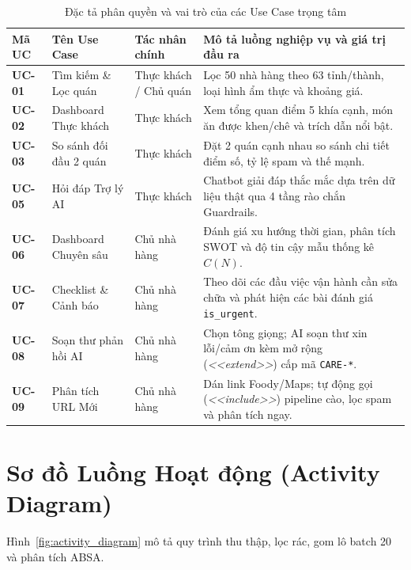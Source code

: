 \begin{table}[H]
\centering
\caption{Đặc tả phân quyền và vai trò của các Use Case trọng tâm}
\label{tab:usecase_spec}
\vspace{0.15cm}
\footnotesize
\begin{tabularx}{\textwidth}{l l l X}
\toprule
\rowcolor{blue!8}
\textbf{Mã UC} & \textbf{Tên Use Case} & \textbf{Tác nhân chính} & \textbf{Mô tả luồng nghiệp vụ và giá trị đầu ra} \\
\midrule
\textbf{UC-01} & Tìm kiếm \& Lọc quán & Thực khách / Chủ quán & Lọc 50 nhà hàng theo 63 tỉnh/thành, loại hình ẩm thực và khoảng giá. \\
\textbf{UC-02} & Dashboard Thực khách & Thực khách & Xem tổng quan điểm 5 khía cạnh, món ăn được khen/chê và trích dẫn nổi bật. \\
\textbf{UC-03} & So sánh đối đầu 2 quán & Thực khách & Đặt 2 quán cạnh nhau so sánh chi tiết điểm số, tỷ lệ spam và thế mạnh. \\
\textbf{UC-05} & Hỏi đáp Trợ lý AI & Thực khách & Chatbot giải đáp thắc mắc dựa trên dữ liệu thật qua 4 tầng rào chắn Guardrails. \\
\textbf{UC-06} & Dashboard Chuyên sâu & Chủ nhà hàng & Đánh giá xu hướng thời gian, phân tích SWOT và độ tin cậy mẫu thống kê $C(N)$. \\
\textbf{UC-07} & Checklist \& Cảnh báo & Chủ nhà hàng & Theo dõi các đầu việc vận hành cần sửa chữa và phát hiện các bài đánh giá \texttt{is\_urgent}. \\
\textbf{UC-08} & Soạn thư phản hồi AI & Chủ nhà hàng & Chọn tông giọng; AI soạn thư xin lỗi/cảm ơn kèm mở rộng (\textit{<<extend>>}) cấp mã \texttt{CARE-*}. \\
\textbf{UC-09} & Phân tích URL Mới & Chủ nhà hàng & Dán link Foody/Maps; tự động gọi (\textit{<<include>>}) pipeline cào, lọc spam và phân tích ngay. \\
\bottomrule
\end{tabularx}
\end{table}

\section{Sơ đồ Luồng Hoạt động (Activity Diagram)}
Hình~\ref{fig:activity_diagram} mô tả quy trình thu thập, lọc rác, gom lô batch 20 và phân tích ABSA.

